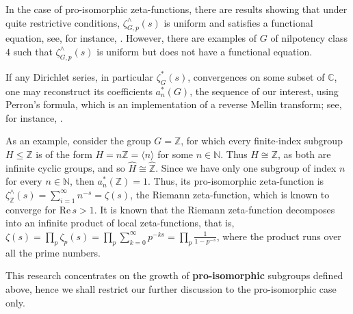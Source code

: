 \documentclass[12pt]{article}
\begin{document}
In the case of pro-isomorphic zeta-functions, there are results showing that under quite restrictive conditions, $\zeta_{G,p}^{\wedge}(s)$ is uniform and satisfies a functional equation, see, for instance, \cite{BermanKlopschOnn}. However, there are examples of $G$ of nilpotency class $4$ such that $\zeta_{G,p}^{\wedge}(s)$ is uniform but does not have a functional equation.

If any Dirichlet series, in particular $\zeta_{G}^{\ast}(s)$, convergences on some subset of $\mathbb{C}$, one may reconstruct its coefficients $a_{n}^{\ast}(G)$, the sequence of our interest, using Perron's formula, which is an implementation of a reverse Mellin transform; see, for instance, \cite{MontgomeryVaughan}.\par
As an example, consider the group $G=\mathbb{Z}$, for which every finite-index subgroup $H\leq{\mathbb{Z}}$ is of the form $H=n\mathbb{Z}=\langle n\rangle$ for some $n\in\mathbb{N}$. Thus $H\cong \mathbb{Z}$, as both are infinite cyclic groups, and so $\widehat{H}\cong\widehat{\mathbb{Z}}$. Since we have only one subgroup of index $n$ for every $n\in\mathbb{N}$, then $a_{n}^{\ast}(\mathbb{Z})=1$. Thus, its pro-isomorphic zeta-function is $\zeta_{\mathbb{Z}}^{\wedge}(s)=\sum_{i=1}^{\infty}n^{-s}=\zeta(s)$, the Riemann zeta-function, which is known to converge for $\mathrm{Re}\,s>1$. It is known that the Riemann zeta-function decomposes into an infinite product of local zeta-functions, that is, $\zeta(s)=\prod_p\zeta_p(s)=\prod_p\sum_{k=0}^\infty p^{-ks}=\prod_p\frac{1}{1-p^{-s}}$, where the product runs over all the prime numbers.\par
This research concentrates on the growth of \textbf{pro-isomorphic} subgroups defined above, hence we shall restrict our further discussion to the pro-isomorphic case only.
\end{document}
